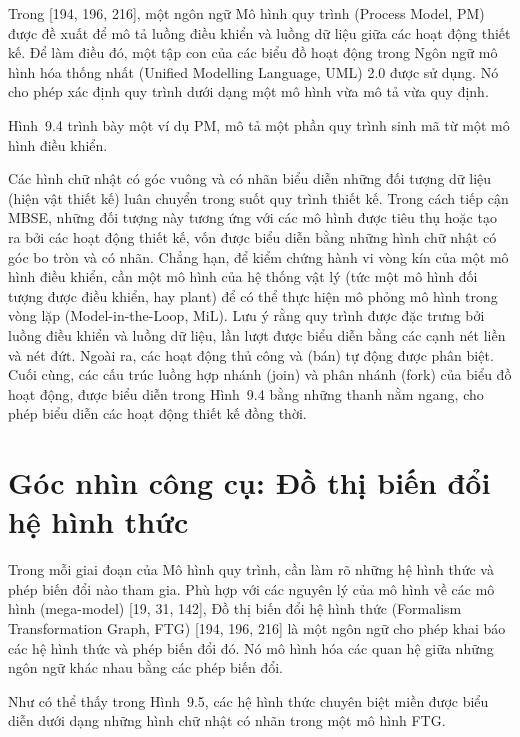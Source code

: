 Trong [194, 196, 216], một ngôn ngữ Mô hình quy trình (Process Model, PM) được đề xuất để mô tả luồng điều khiển và luồng dữ liệu giữa các hoạt động thiết kế. Để làm điều đó, một tập con của các biểu đồ hoạt động trong Ngôn ngữ mô hình hóa thống nhất (Unified Modelling Language, UML) 2.0 được sử dụng. Nó cho phép xác định quy trình dưới dạng một mô hình vừa mô tả vừa quy định.

Hình~9.4 trình bày một ví dụ PM, mô tả một phần quy trình sinh mã từ một mô hình điều khiển.


Các hình chữ nhật có góc vuông và có nhãn biểu diễn những đối tượng dữ liệu (hiện vật thiết kế) luân chuyển trong suốt quy trình thiết kế. Trong cách tiếp cận MBSE, những đối tượng này tương ứng với các mô hình được tiêu thụ hoặc tạo ra bởi các hoạt động thiết kế, vốn được biểu diễn bằng những hình chữ nhật có góc bo tròn và có nhãn. Chẳng hạn, để kiểm chứng hành vi vòng kín của một mô hình điều khiển, cần một mô hình của hệ thống vật lý (tức một mô hình đối tượng được điều khiển, hay plant) để có thể thực hiện mô phỏng mô hình trong vòng lặp (Model-in-the-Loop, MiL). Lưu ý rằng quy trình được đặc trưng bởi luồng điều khiển và luồng dữ liệu, lần lượt được biểu diễn bằng các cạnh nét liền và nét đứt. Ngoài ra, các hoạt động thủ công và (bán) tự động được phân biệt. Cuối cùng, các cấu trúc luồng hợp nhánh (join) và phân nhánh (fork) của biểu đồ hoạt động, được biểu diễn trong Hình~9.4 bằng những thanh nằm ngang, cho phép biểu diễn các hoạt động thiết kế đồng thời.

\section{Góc nhìn công cụ: Đồ thị biến đổi hệ hình thức}
Trong mỗi giai đoạn của Mô hình quy trình, cần làm rõ những hệ hình thức và phép biến đổi nào tham gia. Phù hợp với các nguyên lý của mô hình về các mô hình (mega-model) [19, 31, 142], Đồ thị biến đổi hệ hình thức (Formalism Transformation Graph, FTG) [194, 196, 216] là một ngôn ngữ cho phép khai báo các hệ hình thức và phép biến đổi đó. Nó mô hình hóa các quan hệ giữa những ngôn ngữ khác nhau bằng các phép biến đổi.

Như có thể thấy trong Hình~9.5, các hệ hình thức chuyên biệt miền được biểu diễn dưới dạng những hình chữ nhật có nhãn trong một mô hình FTG.

